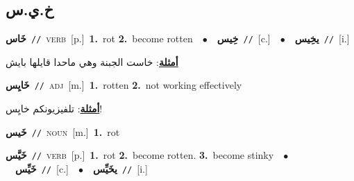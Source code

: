\documentclass[10pt,a4paper,twoside]{article} %
\begin{document}
\begin{multicols}{2}
\vspace{-3mm}
\subsection*{\color{blue}\foreignlanguage{arabic}{خ.ي.س}\color{blue}{}} 

{\setlength\topsep{0pt}\textbf{\foreignlanguage{arabic}{خَاس}}\ {\color{gray}\texttt{//}\color{black}}\ \textsc{verb}\ [p.]\ \textbf{1.}~rot  \textbf{2.}~become rotten\ \ $\bullet$\ \ \setlength\topsep{0pt}\textbf{\foreignlanguage{arabic}{خِيس}}\ {\color{gray}\texttt{//}\color{black}}\ [c.]\ \ $\bullet$\ \ \setlength\topsep{0pt}\textbf{\foreignlanguage{arabic}{يخِيس}}\ {\color{gray}\texttt{//}\color{black}}\ [i.]\  \begin{flushright}\color{gray}\foreignlanguage{arabic}{\textbf{\underline{\foreignlanguage{arabic}{أمثلة}}}: خاست الجبنة وهي ماحدا قايلها بايش}\end{flushright}\color{black}} \vspace{2mm}

{\setlength\topsep{0pt}\textbf{\foreignlanguage{arabic}{خَايِس}}\ {\color{gray}\texttt{//}\color{black}}\ \textsc{adj}\ [m.]\ \textbf{1.}~rotten  \textbf{2.}~not working effectively\  \begin{flushright}\color{gray}\foreignlanguage{arabic}{\textbf{\underline{\foreignlanguage{arabic}{أمثلة}}}: تلفيزيونكم خايِس!}\end{flushright}\color{black}} \vspace{2mm}

{\setlength\topsep{0pt}\textbf{\foreignlanguage{arabic}{خَيس}}\ {\color{gray}\texttt{//}\color{black}}\ \textsc{noun}\ [m.]\ \textbf{1.}~rot\ } \vspace{2mm}

{\setlength\topsep{0pt}\textbf{\foreignlanguage{arabic}{خَيَّس}}\ {\color{gray}\texttt{//}\color{black}}\ \textsc{verb}\ [p.]\ \textbf{1.}~rot  \textbf{2.}~become rotten.  \textbf{3.}~become stinky\ \ $\bullet$\ \ \setlength\topsep{0pt}\textbf{\foreignlanguage{arabic}{خَيِّس}}\ {\color{gray}\texttt{//}\color{black}}\ [c.]\ \ $\bullet$\ \ \setlength\topsep{0pt}\textbf{\foreignlanguage{arabic}{يخَيِّس}}\ {\color{gray}\texttt{//}\color{black}}\ [i.]\ } \vspace{2mm}


\end{multicols}
\end{document}
